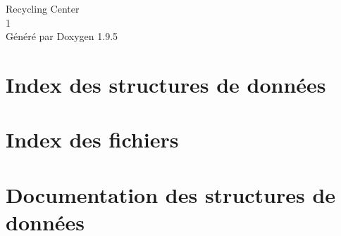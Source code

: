 \documentclass[twoside]{book}
\newcommand{\+}{\discretionary{\mbox{\scriptsize$\hookleftarrow$}}{}{}}
\newcommand{\clearemptydoublepage}{%
    \newpage{\pagestyle{empty}\cleardoublepage}%
  }
\begin{document}
  \raggedbottom
    \hypersetup{pageanchor=false,
                bookmarksnumbered=true,
                pdfencoding=unicode
               }
  \begin{titlepage}
  \vspace*{7cm}
  \begin{center}%
  {\Large Recycling Center}\\
  [1ex]\large 1 \\
  \vspace*{1cm}
  {\large Généré par Doxygen 1.9.5}\\
  \end{center}
  \end{titlepage}
  \clearemptydoublepage
  \tableofcontents
  \clearemptydoublepage
  \hypersetup{pageanchor=true}
\chapter{Index des structures de données}

\chapter{Index des fichiers}

\chapter{Documentation des structures de données}










\end{document}

